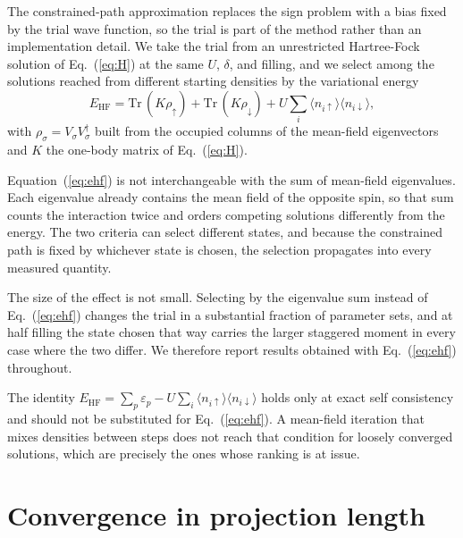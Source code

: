 \documentclass[aps,prb,reprint,superscriptaddress,amsmath,amssymb,floatfix]{revtex4-2}
\begin{document}
The constrained-path approximation replaces the sign problem with a bias fixed
by the trial wave function, so the trial is part of the method rather than an
implementation detail. We take the trial from an unrestricted Hartree-Fock
solution of Eq.~(\ref{eq:H}) at the same $U$, $\delta$, and filling, and we
select among the solutions reached from different starting densities by the
variational energy
\begin{equation}
E_{\mathrm{HF}} = \mathrm{Tr}\,(K \rho_{\uparrow}) + \mathrm{Tr}\,(K \rho_{\downarrow})
                + U \sum_i \langle n_{i\uparrow}\rangle \langle n_{i\downarrow}\rangle ,
\label{eq:ehf}
\end{equation}
with $\rho_{\sigma} = V_{\sigma} V_{\sigma}^{\dagger}$ built from the occupied
columns of the mean-field eigenvectors and $K$ the one-body matrix of
Eq.~(\ref{eq:H}).

Equation~(\ref{eq:ehf}) is not interchangeable with the sum of mean-field
eigenvalues. Each eigenvalue already contains the mean field of the opposite
spin, so that sum counts the interaction twice and orders competing solutions
differently from the energy. The two criteria can select different states, and
because the constrained path is fixed by whichever state is chosen, the
selection propagates into every measured quantity.

The size of the effect is not small. Selecting by the eigenvalue sum instead of
Eq.~(\ref{eq:ehf}) changes the trial in a substantial fraction of parameter
sets, and at half filling the state chosen that way carries the larger staggered
moment in every case where the two differ. We therefore report results obtained
with Eq.~(\ref{eq:ehf}) throughout.

The identity $E_{\mathrm{HF}} = \sum_p \varepsilon_p - U \sum_i \langle
n_{i\uparrow}\rangle \langle n_{i\downarrow}\rangle$ holds only at exact self
consistency and should not be substituted for Eq.~(\ref{eq:ehf}). A mean-field
iteration that mixes densities between steps does not reach that condition for
loosely converged solutions, which are precisely the ones whose ranking is at
issue.


\section{Convergence in projection length}
\label{app:beta}
\end{document}
